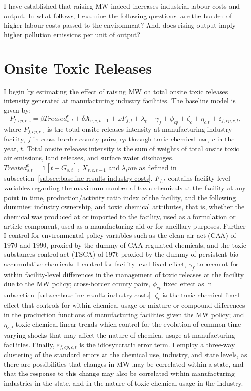 \documentclass[12pt, english]{article}
\begin{document}
    I have established that raising MW indeed increases industrial labour costs and output. In what follows, I examine the following questions: are the burden of higher labour costs passed to the environment? And, does rising output imply higher pollution emissions per unit of output?


    \section{Onsite Toxic Releases}\label{sec:onsite-toxic-releases}
    I begin by estimating the effect of raising MW on total onsite toxic releases intensity generated at manufacturing industry facilities. The baseline model is given by:
    \begin{equation}
        P_{f,cp,c,t} = \beta Treated_{s,t}^e + \delta X_{v,c,t-1} + \omega F_{f,t} + \lambda_{t} + \gamma_{f} + \phi_{cp} + \zeta_{c} + \eta_{c,t} + \varepsilon_{f,cp,c,t},\label{eq:baseline-total-onsite-releases-intensity}
    \end{equation}
    where $P_{f,cp,c,t}$ is the total onsite releases intensity at manufacturing industry facility, $f$ in cross-border county pairs, $cp$ through toxic chemical use, $c$ in the year, $t$. Total onsite releases intensity is the sum of weights of total onsite toxic air emissions, land releases, and surface water discharges. $Treated_{s,t}^e = \textbf{1}[t - G_{s,t}]$, $X_{v,c,t-1}$ and $\lambda_{t}$are as defined in subsection~\ref{subsec:baseline-results-industry-costs}. $F_{f,t}$ contains facility-level variables regarding the maximum number of toxic chemicals at the facility at any point in time, production/activity ratio index of the facility, and the following dummies: industry ownership, and toxic chemical attributes, that is, whether the chemical was produced at or imported to the facility, used as a formulation or article component, used as a manufacturing aid or for ancillary purposes. Further I control for environmental policy variables such as the clean air act (CAA) of $1970$ and $1990$, proxied by the dummy of CAA regulated chemicals, and the toxic substances control act (TSCA) of $1976$ proxied by the dummy of persistent bio-accumulative chemicals. I control for facility-level fixed effect, $\gamma_{f}$ to account for within facility-level differences in the management of toxic releases at the facility due to the MW policy; cross-border county pairs, $\phi_{cp}$ fixed effect as in subsection~\ref{subsec:baseline-results-industry-costs}. $\zeta_{c}$ is the toxic chemical-fixed effect that controls for within chemical usage or mixture or compound differences in the production functions of manufacturing facilities given the MW policy; and $\eta_{c,t}$ toxic chemical linear trends which control for the evolution of common time varying shocks that may affect the nature of chemical usage at manufacturing facilities. Finally, $\varepsilon_{f,cp,c,t}$ is the idiosyncratic error term. I employ a three-way clustering of the standard errors at the chemical use, industry, and state levels, as there are possibilities that changes in MW may be correlated within a state, and that the response to this change may also be correlated within manufacturing industries in the state, and in the nature of toxic chemical usage in the industry.
\end{document}
